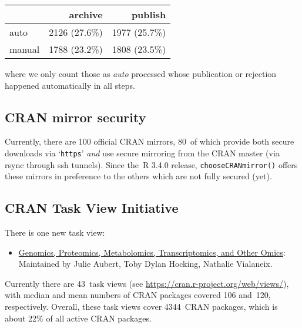 \begin{longtable}[]{@{}lrr@{}}
\toprule\noalign{}
& archive & publish \\
\midrule\noalign{}
\endhead
\bottomrule\noalign{}
\endlastfoot
auto & 2126 (27.6\%) & 1977 (25.7\%) \\
manual & 1788 (23.2\%) & 1808 (23.5\%) \\
\end{longtable}

\noindent where we only count those as \emph{auto} processed whose publication or
rejection happened automatically in all steps.

\hypertarget{cran-mirror-security}{%
\subsection{CRAN mirror security}\label{cran-mirror-security}}

Currently, there are 100 official CRAN mirrors,
80~of which provide both
secure downloads via `\texttt{https}' \emph{and} use secure mirroring from the CRAN master
(via rsync through ssh tunnels). Since the~R 3.4.0 release, \texttt{chooseCRANmirror()}
offers these mirrors in preference to the others which are not fully secured (yet).

\hypertarget{cran-task-view-initiative}{%
\subsection{CRAN Task View Initiative}\label{cran-task-view-initiative}}

There is one new task view:

\begin{itemize}
\tightlist
\item
  \href{https://CRAN.R-project.org/view=Omics}{Genomics, Proteomics, Metabolomics, Transcriptomics, and Other Omics}: Maintained by Julie Aubert, Toby Dylan Hocking, Nathalie Vialaneix.
\end{itemize}

Currently there are 43~task views (see \url{https://cran.r-project.org/web/views/}),
with median and mean numbers of CRAN packages covered
106 and~120, respectively.
Overall, these task views cover 4344~CRAN packages,
which is about 22\% of all active CRAN packages.


\address{%
Kurt Hornik\\
WU Wirtschaftsuniversität Wien\\%
Austria\\
%
%
\textit{ORCiD: \href{https://orcid.org/0000-0003-4198-9911}{0000-0003-4198-9911}}\\%
\href{mailto:Kurt.Hornik@R-project.org}{\nolinkurl{Kurt.Hornik@R-project.org}}%
}

